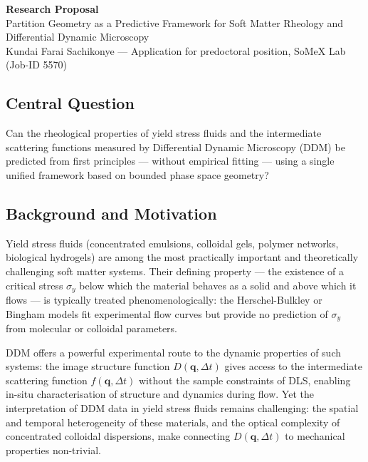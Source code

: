 \documentclass[12pt,a4paper]{article}
\begin{document}
\begin{center}
  {\large\textbf{Research Proposal}} \\[6pt]
  {\large Partition Geometry as a Predictive Framework for Soft Matter Rheology
  and Differential Dynamic Microscopy} \\[6pt]
  Kundai Farai Sachikonye --- Application for predoctoral position, SoMeX Lab
  (Job-ID 5570)
\end{center}

\vspace{1em}

\subsection*{Central Question}

Can the rheological properties of yield stress fluids and the intermediate
scattering functions measured by Differential Dynamic Microscopy (DDM) be
predicted from first principles --- without empirical fitting --- using a single
unified framework based on bounded phase space geometry?

\subsection*{Background and Motivation}

Yield stress fluids (concentrated emulsions, colloidal gels, polymer networks,
biological hydrogels) are among the most practically important and theoretically
challenging soft matter systems. Their defining property --- the existence of a
critical stress $\sigma_y$ below which the material behaves as a solid and above
which it flows --- is typically treated phenomenologically: the Herschel-Bulkley
or Bingham models fit experimental flow curves but provide no prediction of $\sigma_y$
from molecular or colloidal parameters.

DDM offers a powerful experimental route to the dynamic properties of such systems:
the image structure function $D(\mathbf{q}, \Delta t)$ gives access to the
intermediate scattering function $f(\mathbf{q}, \Delta t)$ without the
sample constraints of DLS, enabling in-situ characterisation of structure and
dynamics during flow.
Yet the interpretation of DDM data in yield stress fluids remains challenging:
the spatial and temporal heterogeneity of these materials, and the optical
complexity of concentrated colloidal dispersions, make connecting $D(\mathbf{q}, \Delta t)$
to mechanical properties non-trivial.
\end{document}

